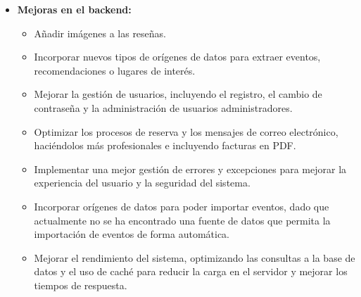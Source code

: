 \begin{itemize}
    \item \textbf{Mejoras en el backend:}
    \begin{itemize}
        \item Añadir imágenes a las reseñas.
        \item Incorporar nuevos tipos de orígenes de datos para extraer eventos, recomendaciones o lugares de interés.
        \item Mejorar la gestión de usuarios, incluyendo el registro, el cambio de contraseña y la administración de usuarios administradores.
        \item Optimizar los procesos de reserva y los mensajes de correo electrónico, haciéndolos más profesionales e incluyendo facturas en PDF.
        \item Implementar una mejor gestión de errores y excepciones para mejorar la experiencia del usuario y la seguridad del sistema.
        \item Incorporar orígenes de datos para poder importar eventos, dado que actualmente no se ha encontrado una fuente de datos que permita la importación de eventos de forma automática.
        \item Mejorar el rendimiento del sistema, optimizando las consultas a la base de datos y el uso de caché para reducir la carga en el servidor y mejorar los tiempos de respuesta.
    \end{itemize}


\end{itemize}
